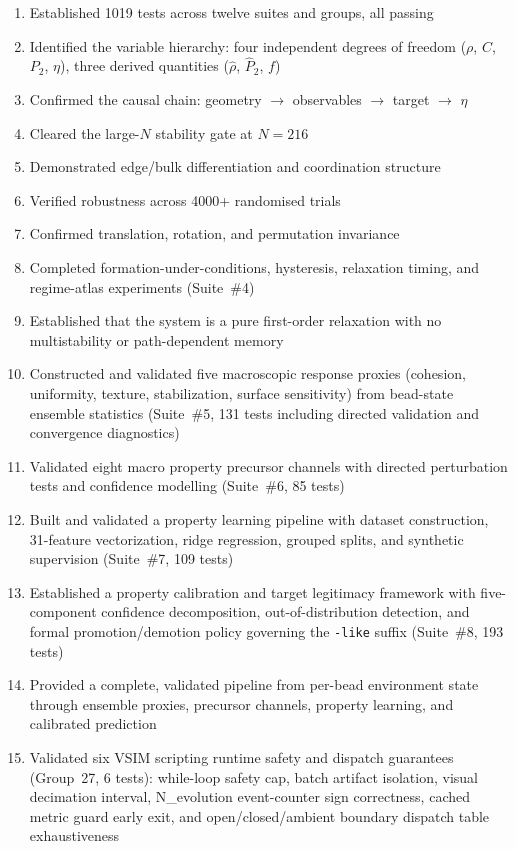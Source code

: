 \documentclass[11pt]{article}
\begin{document}
\begin{enumerate}
    \item Established 1019 tests across twelve suites and groups, all passing
    \item Identified the variable hierarchy: four independent degrees of
          freedom ($\rho$, $C$, $P_2$, $\eta$), three derived quantities
          ($\hat{\rho}$, $\hat{P}_2$, $f$)
    \item Confirmed the causal chain: geometry $\to$ observables $\to$
          target $\to$ $\eta$
    \item Cleared the large-$N$ stability gate at $N = 216$
    \item Demonstrated edge/bulk differentiation and coordination
          structure
    \item Verified robustness across 4000+ randomised trials
    \item Confirmed translation, rotation, and permutation invariance
    \item Completed formation-under-conditions, hysteresis, relaxation
          timing, and regime-atlas experiments (Suite~\#4)
    \item Established that the system is a pure first-order relaxation
          with no multistability or path-dependent memory
    \item Constructed and validated five macroscopic response proxies
          (cohesion, uniformity, texture, stabilization, surface
          sensitivity) from bead-state ensemble statistics (Suite~\#5,
          131 tests including directed validation and convergence diagnostics)
    \item Validated eight macro property precursor channels with directed
          perturbation tests and confidence modelling (Suite~\#6, 85 tests)
    \item Built and validated a property learning pipeline with dataset
          construction, 31-feature vectorization, ridge regression,
          grouped splits, and synthetic supervision (Suite~\#7, 109 tests)
    \item Established a property calibration and target legitimacy
          framework with five-component confidence decomposition,
          out-of-distribution detection, and formal promotion/demotion
          policy governing the \texttt{-like} suffix (Suite~\#8, 193 tests)
    \item Provided a complete, validated pipeline from per-bead environment
          state through ensemble proxies, precursor channels, property
          learning, and calibrated prediction
    \item Validated six VSIM scripting runtime safety and dispatch
          guarantees (Group~27, 6 tests): while-loop safety cap,
          batch artifact isolation, visual decimation interval, N\_evolution
          event-counter sign correctness, cached metric guard early exit,
          and open/closed/ambient boundary dispatch table exhaustiveness
\end{enumerate}
\end{document}
